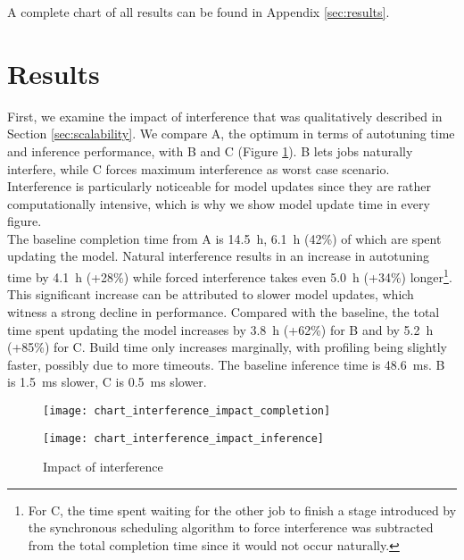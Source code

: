 A complete chart of all results can be found in Appendix \ref{sec:results}.

\section{Results}
First, we examine the impact of interference that was qualitatively described in Section \ref{sec:scalability}. We compare A, the optimum in terms of autotuning time and inference performance, with B and C (Figure \ref{fig:chart-interference-impact}). B lets jobs naturally interfere, while C forces maximum interference as worst case scenario. Interference is particularly noticeable for model updates since they are rather computationally intensive, which is why we show model update time in every figure.\\
The baseline completion time from A is \SI{14.5}{\hour}, \SI{6.1}{\hour} (42\%) of which are spent updating the model. Natural interference results in an increase in autotuning time by \SI{4.1}{\hour} (+28\%) while forced interference takes even \SI{5.0}{\hour} (+34\%) longer\footnote{For C, the time spent waiting for the other job to finish a stage introduced by the synchronous scheduling algorithm to force interference was subtracted from the total completion time since it would not occur naturally.}. This significant increase can be attributed to slower model updates, which witness a strong decline in performance. Compared with the baseline, the total time spent updating the model increases by \SI{3.8}{\hour} (+62\%) for B and by \SI{5.2}{\hour} (+85\%) for C. Build time only increases marginally, with profiling being slightly faster, possibly due to more timeouts. The baseline inference time is \SI{48.6}{\milli\second}. B is \SI{1.5}{\milli\second} slower, C is \SI{0.5}{\milli\second} slower. 

\begin{figure}[t]
	\begin{minipage}[b]{.6\textwidth}
		\centering\texttt{[image: chart\_interference\_impact\_completion]}
		\label{fig:chart-interference-impact-completion}
	\end{minipage}%
	\hfill
	\begin{minipage}[b]{.35\textwidth}
		\centering\texttt{[image: chart\_interference\_impact\_inference]}
		\label{fig:chart-interference-impact-inference}
	\end{minipage}
	\caption{Impact of interference}
	\label{fig:chart-interference-impact}
\end{figure}

